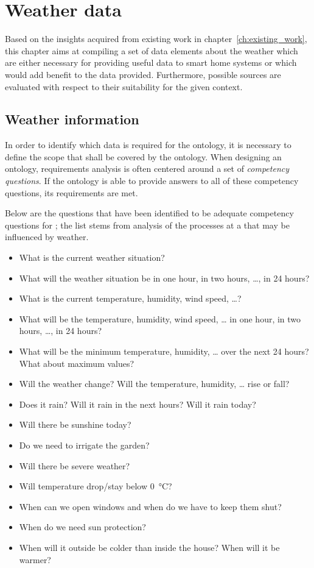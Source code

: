\chapter{Weather data}
\label{ch:weather_data}

Based on the insights acquired from existing work in chapter~\ref{ch:existing_work}, this chapter aims at compiling a set of data elements about the weather which are either necessary for providing useful data to smart home systems or which would add benefit to the data provided. Furthermore, possible sources are evaluated with respect to their suitability for the given context.

\section{Weather information}
\label{sec:weather_information}

In order to identify which data is required for the \smarthomeweather ontology, it is necessary to define the scope that shall be covered by the ontology. When designing an ontology, requirements analysis is often centered around a set of \emph{competency questions}\cite{Ontology101,UscholdKing,GruningerFox,Methontology}. If the ontology is able to provide answers to all of these competency questions, its requirements are met.

Below are the questions that have been identified to be adequate competency questions for \smarthomeweather; the list stems from analysis of the processes at a \smarthome that may be influenced by weather.

\begin{itemize}
  \item What is the current weather situation?
  \item What will the weather situation be in one hour, in two hours, …, in 24 hours?
  \item What is the current temperature, humidity, wind speed, …?
  \item What will be the temperature, humidity, wind speed, … in one hour, in two hours, …, in 24 hours?
  \item What will be the minimum temperature, humidity, … over the next 24 hours? What about maximum values?
  \item Will the weather change? Will the temperature, humidity, … rise or fall?
  \item Does it rain? Will it rain in the next hours? Will it rain today?
  \item Will there be sunshine today? 
  \item Do we need to irrigate the garden?
  \item Will there be severe weather?
  \item Will temperature drop/stay below \SI{0}{\celsius}?
  \item When can we open windows and when do we have to keep them shut?
  \item When do we need sun protection?
  \item When will it outside be colder than inside the house? When will it be warmer?
\end{itemize}

